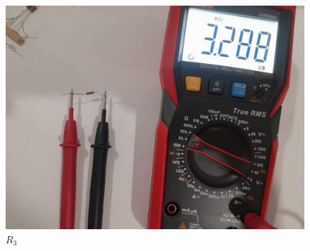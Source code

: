 \documentclass[a4paper,12pt]{article}
\begin{document}
\begin{itemize}
\begin{figure}[H]
\begin{minipage}{0.35\textwidth}
        \includegraphics[width=\linewidth]{imagenes/r3.jpg}
        \caption*{$R_3$}
    \end{minipage}
\end{figure}

\end{itemize}
\end{document}
